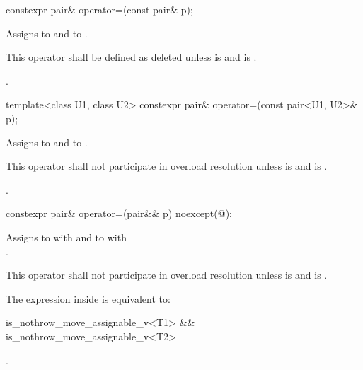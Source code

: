%
\begin{itemdecl}
constexpr pair& operator=(const pair& p);
\end{itemdecl}

\begin{itemdescr}
\pnum
\effects
Assigns  to  and  to .

\pnum
\remarks
This operator shall be defined as deleted unless
 is 
and  is .

\pnum
\returns
{}.
\end{itemdescr}

%
\begin{itemdecl}
template<class U1, class U2> constexpr pair& operator=(const pair<U1, U2>& p);
\end{itemdecl}

\begin{itemdescr}
\pnum
\effects
Assigns  to  and  to .

\pnum
\remarks
This operator shall not participate in overload resolution unless
 is 
and  is .

\pnum
\returns
{}.
\end{itemdescr}

%
\begin{itemdecl}
constexpr pair& operator=(pair&& p) noexcept(@\seebelow@);
\end{itemdecl}

\begin{itemdescr}
\pnum
\effects
Assigns to  with 
and to  with\\ .

\pnum
\remarks
This operator shall not participate in overload resolution unless
 is 
and  is .

\pnum
\remarks
The expression inside  is equivalent to:
\begin{codeblock}
is_nothrow_move_assignable_v<T1> && is_nothrow_move_assignable_v<T2>
\end{codeblock}

\pnum
\returns
{}.
\end{itemdescr}

